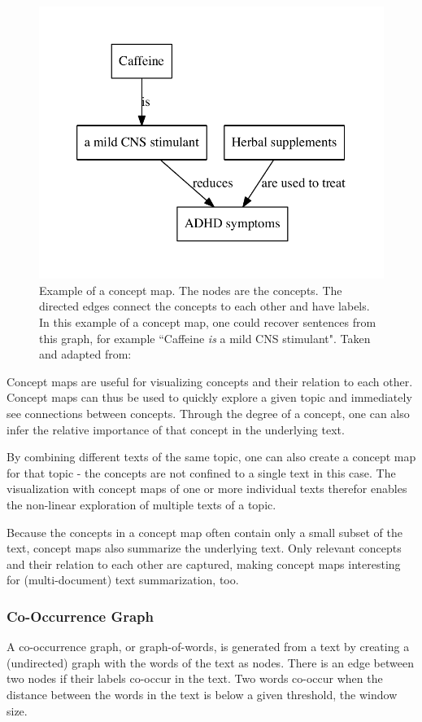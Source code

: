 \begin{figure}[ht]
\centering
\includegraphics[width=0.5\linewidth]{assets/figures/concept_map.pdf}
\caption{Example of a concept map. The nodes are the concepts. The directed edges connect the concepts to each other and have labels. In this example of a concept map, one could recover sentences from this graph, for example ``Caffeine \textit{is} a mild CNS stimulant". Taken and adapted from: \cite{Falke2017}}
\label{fig:concept_map}
\end{figure}

Concept maps are useful for visualizing concepts and their relation to each other.
Concept maps can thus be used to quickly explore a given topic and immediately see connections between concepts.
Through the degree of a concept, one can also infer the relative importance of that concept in the underlying text.

By combining different texts of the same topic, one can also create a concept map for that topic - the concepts are not confined to a single text in this case.
The visualization with concept maps of one or more individual texts therefor enables the non-linear exploration of multiple texts of a topic.

Because the concepts in a concept map often contain only a small subset of the text, concept maps also summarize the underlying text.
Only relevant concepts and their relation to each other are captured, making concept maps interesting for (multi-document) text summarization, too.




\subsubsection{Co-Occurrence Graph}
A co-occurrence graph, or graph-of-words, is generated from a text by creating a (undirected) graph with the words of the text as nodes.
There is an edge between two nodes if their labels co-occur in the text.
Two words co-occur when the distance between the words in the text is below a given threshold, the window size.


